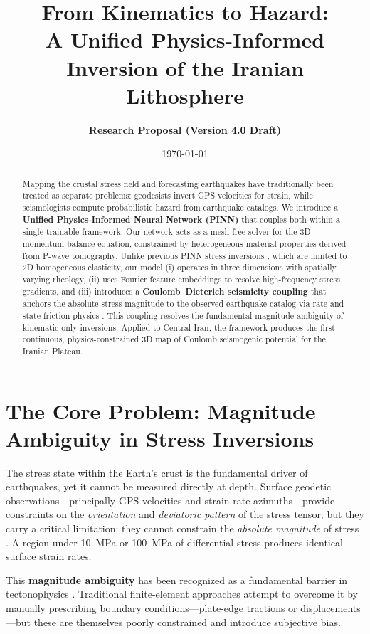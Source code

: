 \documentclass[11pt, a4paper]{article}
\title{\textbf{From Kinematics to Hazard: \\ A Unified Physics-Informed Inversion of the Iranian Lithosphere}}
\author{\textbf{Research Proposal (Version 4.0 Draft)}}
\date{\today}
\begin{document}
\maketitle

\begin{abstract}
Mapping the crustal stress field and forecasting earthquakes have traditionally been treated as separate problems: geodesists invert GPS velocities for strain, while seismologists compute probabilistic hazard from earthquake catalogs. We introduce a \textbf{Unified Physics-Informed Neural Network (PINN)} that couples both within a single trainable framework. Our network acts as a mesh-free solver for the 3D momentum balance equation, constrained by heterogeneous material properties derived from P-wave tomography. Unlike previous PINN stress inversions \cite{Masson2023}, which are limited to 2D homogeneous elasticity, our model (i) operates in three dimensions with spatially varying rheology, (ii) uses Fourier feature embeddings to resolve high-frequency stress gradients, and (iii) introduces a \textbf{Coulomb--Dieterich seismicity coupling} that anchors the absolute stress magnitude to the observed earthquake catalog via rate-and-state friction physics \cite{Dieterich1994}. This coupling resolves the fundamental magnitude ambiguity of kinematic-only inversions. Applied to Central Iran, the framework produces the first continuous, physics-constrained 3D map of Coulomb seismogenic potential for the Iranian Plateau.
\end{abstract}

\section{The Core Problem: Magnitude Ambiguity in Stress Inversions}

The stress state within the Earth's crust is the fundamental driver of earthquakes, yet it cannot be measured directly at depth. Surface geodetic observations---principally GPS velocities and strain-rate azimuths---provide constraints on the \textit{orientation} and \textit{deviatoric pattern} of the stress tensor, but they carry a critical limitation: they cannot constrain the \textit{absolute magnitude} of stress \cite{Khorrami2019}. A region under 10~MPa or 100~MPa of differential stress produces identical surface strain rates.

This \textbf{magnitude ambiguity} has been recognized as a fundamental barrier in tectonophysics \cite{Heidbach2018}. Traditional finite-element approaches \cite{Zamani2017, Rajabi2017} attempt to overcome it by manually prescribing boundary conditions---plate-edge tractions or displacements---but these are themselves poorly constrained and introduce subjective bias.
\end{document}
